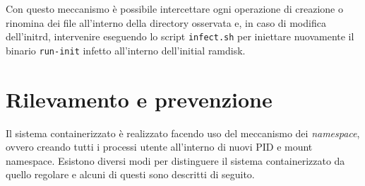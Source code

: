 \documentclass{article}
\begin{document}
Con questo meccanismo è possibile intercettare ogni operazione di creazione o rinomina dei file all'interno della directory osservata e, in caso di modifica dell'initrd, intervenire eseguendo lo script \texttt{infect.sh} per iniettare nuovamente il binario \texttt{run-init} infetto all'interno dell'initial ramdisk.

\section{Rilevamento e prevenzione}
Il sistema containerizzato è realizzato facendo uso del meccanismo dei \textsl{namespace}, ovvero creando tutti i processi utente all'interno di nuovi PID e mount namespace. Esistono diversi modi per distinguere il sistema containerizzato da quello regolare e alcuni di questi sono descritti di seguito.
\end{document}
